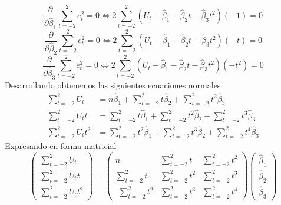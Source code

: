 \documentclass[10pt,a4paper, openany ]{book}
\begin{document}
  \begin{equation*}
      \dfrac{\partial}{\partial{\hat{\beta}_{1}}}\sum\limits_{t=-2}^{2}e^{2}_{t} = 0 \Longleftrightarrow 2\sum\limits_{t=-2}^{2}( U_{t}-\hat{\beta}_{1}-\hat{\beta}_2t-\hat{\beta}_{3}t^{2}) (-1) = 0
  \end{equation*}
  \begin{equation*}
          \dfrac{\partial}{\partial{\hat{\beta}_{2}}}\sum\limits_{t=-2}^{2}e^{2}_{t} = 0 \Longleftrightarrow 2\sum\limits_{t=-2}^{2}( U_{t}-\hat{\beta}_{1}-\hat{\beta}_2t-\hat{\beta}_{3}t^{2}) (-t) = 0
  \end{equation*}
  \begin{equation*}
          \dfrac{\partial}{\partial{\hat{\beta}_{3}}}\sum\limits_{t=-2}^{2}e^{2}_{t} =0 \Longleftrightarrow 2\sum\limits_{t=-2}^{2}( U_{t}-\hat{\beta}_{1}-\hat{\beta}_2t-\hat{\beta}_{3}t^{2}) (-t^{2}) = 0 
  \end{equation*}
  Desarrollando obtenemos las siguientes ecuaciones normales
  \begin{align*}
      \sum\limits_{t=-2}^{2}U_{t}  & = n\hat{\beta}_{1}+ \sum\limits_{t=-2}^{2}t\hat{\beta}_{2}+\sum\limits_{t=-2}^{2}t^{2}\hat{\beta}_{3} \\
        \sum\limits_{t=-2}^{2}U_{t}t &  =  \sum\limits_{t=-2}^{2}t\hat{\beta}_{1}+\sum\limits_{t=-2}^{2}t^{2}\hat{\beta}_{2}+\sum\limits_{t=-2}^{2}t^{3}\hat{\beta}_{3}\\
        \sum\limits_{t=-2}^{2}U_{t}t^{2} & =  \sum\limits_{t=-2}^{2}t^{2}\hat{\beta}_{1}+\sum\limits_{t=-2}^{2}t^{3}\hat{\beta}_{2}+\sum\limits_{t=-2}^{2}t^{4}\hat{\beta}_{3}
  \end{align*}
  Expresando en forma matricial
  \begin{equation*}
  \begin{pmatrix}
  \sum\limits_{t=-2}^{2}U_{t}  \\
  \sum\limits_{t=-2}^{2}U_{t}t \\
  \sum\limits_{t=-2}^{2}U_{t}t^{2} 
  \end{pmatrix} = 
  \begin{pmatrix}
  n & \sum\limits_{t=-2}^{2}t & \sum\limits_{t=-2}^{2}t^{2}  \\
  \sum\limits_{t=-2}^{2}t & \sum\limits_{t=-2}^{2}t^{2} & \sum\limits_{t=-2}^{2}t^{3} \\
  \, \, \sum\limits_{t=-2}^{2}t^{2} & \sum\limits_{t=-2}^{2}t^{3} & \sum\limits_{t=-2}^{2}t^{4}
  \end{pmatrix}
  \begin{pmatrix}
  \hat{\beta}_{1} \\
    \hat{\beta}_{2}\\
  \hat{\beta}_{3}
  \end{pmatrix}
  \end{equation*}
\end{document}
